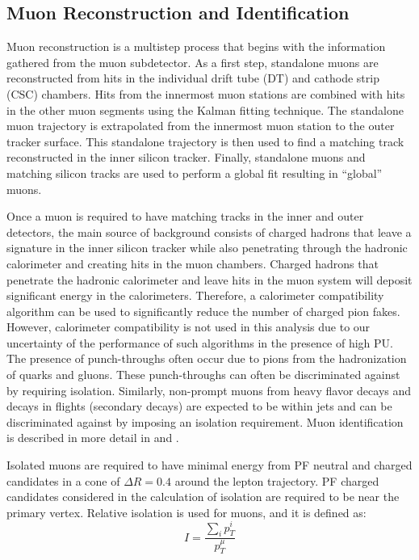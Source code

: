 \subsection{Muon Reconstruction and Identification}\label{ss:muonreco}

Muon reconstruction is a multistep process that begins with the information gathered from the muon subdetector. As a
first step, standalone muons are reconstructed from hits in the individual drift tube (DT) and
cathode strip (CSC) chambers. Hits from the innermost muon stations are combined with hits in the other muon segments
using the Kalman fitting technique\cite{Kalman}. The standalone muon trajectory is extrapolated from the
innermost muon station to the outer tracker surface. This standalone trajectory is then used to find a matching track
reconstructed in the inner silicon tracker. Finally, standalone muons and matching silicon tracks are used to perform a
global fit resulting in ``global'' muons. 

Once a muon is required to have matching tracks in the inner and outer detectors,
the main source of background consists of charged hadrons that leave a
signature in the inner silicon tracker while also penetrating through the hadronic calorimeter and creating hits in the
muon chambers. Charged hadrons that penetrate the hadronic calorimeter and leave hits in the muon system will deposit 
significant energy in the calorimeters. Therefore, a calorimeter compatibility algorithm can be used to significantly 
reduce the number of charged pion fakes. However, calorimeter compatibility is not used in this analysis due to our 
uncertainty of the performance of such algorithms in the presence of high PU. 
The presence of punch-throughs often occur due to pions from the hadronization of quarks and gluons. These punch-throughs 
can often be discriminated against by requiring isolation. Similarly, non-prompt muons from heavy flavor decays and 
decays in flights (secondary decays) are expected to be within jets and can be discriminated against by imposing an isolation requirement. 
Muon identification is described in more detail in \cite{CMS_MUO_10-004} and \cite{CMS_MUO_11-001}.

Isolated muons are required to have minimal energy from PF neutral and charged candidates in a cone of $\Delta R =
0.4$ around the lepton trajectory. PF charged candidates considered in the calculation of isolation are required to be near the 
primary vertex. Relative isolation is used for muons, and it is defined as:
\begin{equation}
   I = \frac{\sum_{i} p_{T}^{i}}{p_{T}^{\mu}}
\label{eq:muIso}
\end{equation}


